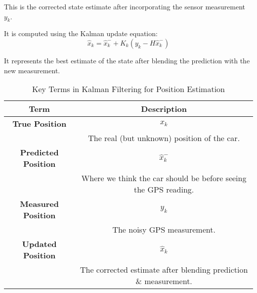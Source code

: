 \documentclass{article}
\begin{document}
This is the corrected state estimate after incorporating the sensor measurement \(y_k\).

It is computed using the Kalman update equation:
\[
\hat{x}_{k} = \hat{x}_{k}^{-} + K_k (y_k - H \hat{x}_{k}^{-})
\]

It represents the best estimate of the state after blending the prediction with the new measurement.


\begin{table}[h]
    \centering
    \begin{tabular}{|c|c|}
        \hline
        \textbf{Term} & \textbf{Description} \\
        \hline
        \textbf{True Position} & $x_k$ \\
        & The real (but unknown) position of the car. \\
        \hline
        \textbf{Predicted Position} & $\hat{x}_k^-$ \\
        & Where we think the car should be before seeing the GPS reading. \\
        \hline
        \textbf{Measured Position} & $y_k$ \\
        & The noisy GPS measurement. \\
        \hline
        \textbf{Updated Position} & $\hat{x}_k$ \\
        & The corrected estimate after blending prediction \& measurement. \\
        \hline
    \end{tabular}
    \caption{Key Terms in Kalman Filtering for Position Estimation}
    \label{tab:kalman_terms}
\end{table}
\end{document}
